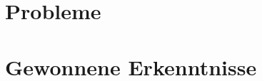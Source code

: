 %
%
%
%
\chapter{Probleme}\label{sec:probleme} 

\chapter{Gewonnene Erkenntnisse}\label{sec:erkenntnisse} 